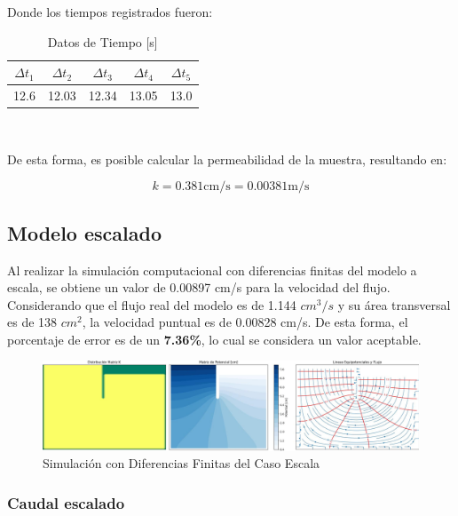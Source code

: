 Donde los tiempos registrados fueron:

\begin{table}[H]
    \centering
    \caption{Datos de Tiempo [s]}
    \begin{tabular}{|c|c|c|c|c|}
    \hline
    $\Delta t_1$ & $\Delta t_2$ & $\Delta t_3$ & $\Delta t_4$ & $\Delta t_5$ \\ \hline
    12.6 & 12.03 & 12.34 & 13.05 & 13.0 \\ \hline
    \end{tabular}\\
    \label{tab:tiempos}
\end{table}

De esta forma, es posible calcular la permeabilidad de la muestra, resultando en:

\begin{equation}
    k = 0.381 \text{cm/s} = 0.00381 \text{m/s}
\end{equation}

\subsection{Modelo escalado}

Al realizar la simulación computacional con diferencias finitas del modelo a escala, se obtiene un valor de 0.00897 cm/s para la velocidad del flujo. Considerando que el flujo real del modelo es de 1.144 $cm^3/s$ y su área transversal es de 138 $cm^2$, la velocidad puntual es de 0.00828 cm/s. De esta forma, el porcentaje de error es de un \textbf{7.36\%}, lo cual se considera un valor aceptable.


\begin{figure}[H]
    \centering
    \includegraphics[width=1\textwidth]{GRAFICOS/laplace_escala_cm.jpg}
    \caption{Simulación con Diferencias Finitas del Caso Escala}
    \label{fig:maqueta_caso_1}
\end{figure}

\subsubsection{Caudal escalado}

